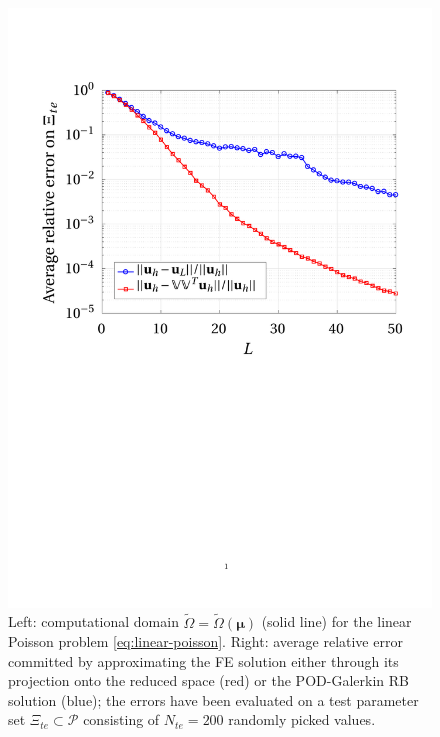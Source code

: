 \documentclass[12pt, a4paper, twoside, openright]{report}
\numberwithin{equation}{chapter}
\theoremstyle{theorem}
\theoremstyle{definition}
\theoremstyle{remark}
\theoremstyle{proposition}
\numberwithin{figure}{chapter}
\newcommand{\wt}[1]{\widetilde{#1}}
\newcommand{\bg}[1]{\boldsymbol{#1}}
\begin{document}
\begin{figure}[t]
\begin{minipage}{0.55\textwidth}
				\includegraphics[scale = 0.48, trim = {2.5cm 12cm 1cm 3.5cm}, clip]{poisson2d_1_error_vs_rank}
			\end{minipage}
			
			\caption{Left: computational domain $\wt{\Omega} = \wt{\Omega}(\bg{\mu})$ (solid line) for the linear Poisson problem \eqref{eq:linear-poisson}. Right: average relative error committed by approximating the FE solution either through its projection onto the reduced space (red) or the POD-Galerkin RB solution (blue); the errors have been evaluated on a test parameter set $\Xi_{te} \subset \mathcal{P}$ consisting of $N_{te} = 200$ randomly picked values.}
			\label{fig:linear-poisson}
		\end{figure}
			
\end{document}
